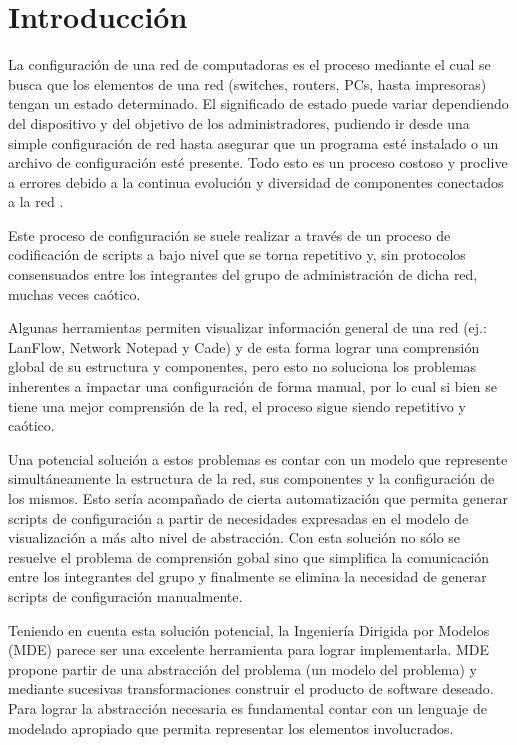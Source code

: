 \chapter{Introducción}

La configuración de una red de computadoras es el proceso mediante el cual se busca que los elementos de una red (switches, routers, PCs, hasta impresoras) tengan un estado determinado. El significado de estado puede variar dependiendo del dispositivo y del objetivo de los administradores, pudiendo ir desde una simple configuración de red hasta asegurar que un programa esté instalado o un archivo de configuración esté presente.
Todo esto es un proceso costoso y proclive a errores debido a la continua evolución y diversidad de componentes conectados a la red \cite{cmscost}.

Este proceso de configuración se suele realizar a través de un proceso de codificación de scripts a bajo nivel que se torna repetitivo y, sin protocolos consensuados entre los integrantes del grupo de administración de dicha red, muchas veces caótico.

Algunas herramientas permiten visualizar información general de una red (ej.: LanFlow\cite{lanflow}, Network Notepad\cite{networknotepad} y Cade) y de esta forma lograr una comprensión global de su estructura y componentes, pero esto no soluciona los problemas inherentes a impactar una configuración de forma manual, por lo cual si bien se tiene una mejor comprensión de la red, el proceso sigue siendo repetitivo y caótico.

Una potencial solución a estos problemas es contar con un modelo que represente simultáneamente la estructura de la red, sus componentes y la configuración de los mismos. Esto sería acompañado de cierta automatización que permita generar scripts de configuración a partir de necesidades expresadas en el modelo de visualización a más alto nivel de abstracción.
Con esta solución no sólo se resuelve el problema de comprensión gobal sino que simplifica la comunicación entre los integrantes del grupo y finalmente se elimina la necesidad de generar scripts de configuración manualmente.

Teniendo en cuenta esta solución potencial, la Ingeniería Dirigida por Modelos (MDE) parece ser una excelente herramienta para lograr implementarla. MDE propone partir de una abstracción del problema (un modelo del problema) y mediante sucesivas transformaciones construir el producto de software deseado\cite{kent2002model}. Para lograr la abstracción necesaria es fundamental contar con un lenguaje de modelado apropiado que permita representar los elementos involucrados.


